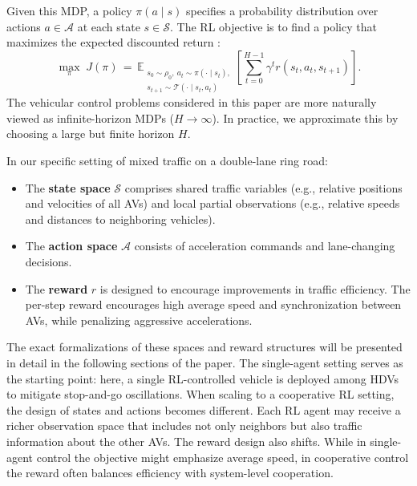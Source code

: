 \documentclass{ifacconf}
\newcommand{\1}{\mbox{1}\hspace{-0.25em}\mbox{l}}
\begin{document}
Given this MDP, a policy $\pi(a \mid s)$ specifies a probability distribution over actions $a \in \mathcal{A}$ at each state $s \in \mathcal{S}$. The RL objective is to find a policy that maximizes the expected discounted return \citep{sutton1998reinforcement}:
\begin{equation}
\max_{\pi}
\; J(\pi)
\,=\,
\mathbb{E}_{\substack{
s_0 \sim \rho_0,\
a_t \sim \pi(\cdot \mid s_t), \\
s_{t+1} \sim \mathcal{T}(\cdot \mid s_t,a_t)
}}
\left[
\sum_{t=0}^{H-1} \gamma^t r(s_t, a_t, s_{t+1})
\right].
\label{eq:mdp_objective}
\end{equation}
The vehicular control problems considered in this paper are more naturally viewed as infinite-horizon MDPs ($H \to \infty$). In practice, we approximate this by choosing a large but finite horizon $H$.

In our specific setting of mixed traffic on a double-lane ring road:
\begin{itemize}
    \item The \textbf{state space} $\mathcal{S}$ comprises shared traffic variables (e.g., relative positions and velocities of all AVs) and local partial observations (e.g., relative speeds and distances to neighboring vehicles).
    \item The \textbf{action space} $\mathcal{A}$ consists of acceleration commands and lane-changing decisions.
    \item The \textbf{reward} $r$ is designed to encourage improvements in traffic efficiency. The per-step reward encourages high average speed and synchronization between AVs, while penalizing aggressive accelerations.

\end{itemize}

The exact formalizations of these spaces and reward structures will be presented in detail in the following sections of the paper. The single-agent setting serves as the starting point: here, a single RL-controlled vehicle is deployed among HDVs to mitigate stop-and-go oscillations. 
When scaling to a cooperative RL setting, the design of states and actions becomes different. Each RL agent may receive a richer observation space that includes not only neighbors but also traffic information about the other AVs. The reward design also shifts. While in single-agent control the objective might emphasize average speed, in cooperative control the reward often balances efficiency with system-level cooperation. 
\end{document}
